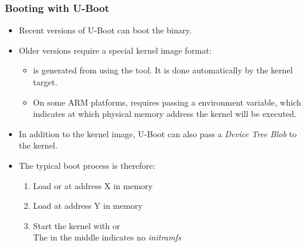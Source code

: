 \begin{frame}
  \frametitle{Booting with U-Boot}
  \begin{itemize}
  \item Recent versions of U-Boot can boot the  binary.
  \item Older versions require a special kernel image format:
    \begin{itemize}
    \item {} is generated from  using the
       tool. It is done automatically by the kernel
       target.
    \item On some ARM platforms,  requires passing a
       environment variable, which indicates at which
      physical memory address the kernel will be executed.
    \end{itemize}
  \item In addition to the kernel image, U-Boot can also pass a
    {\em Device Tree Blob} to the kernel.
  \item The typical boot process is therefore:
    \begin{enumerate}
    \item Load  or  at address X in memory
    \item Load  at address Y in memory
    \item Start the kernel with  or
      \\
      The \code{-} in the middle indicates no {\em initramfs}
    \end{enumerate}
  \end{itemize}
\end{frame}

